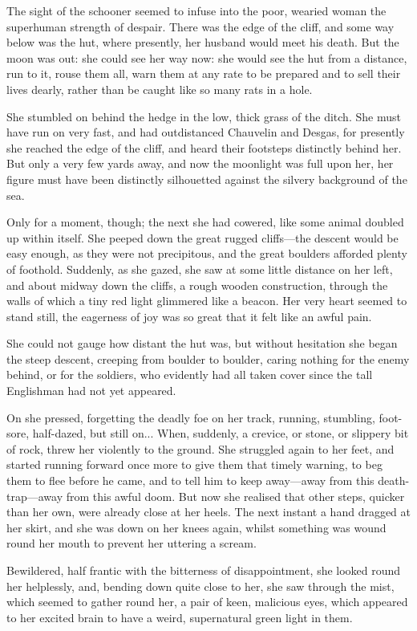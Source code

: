 \documentclass[paper=5.5in:8.5in,BCOR=7mm,twoside,DIV=calc,12pt,usegeometry,chapterprefix,endperiod,headings=big]{scrbook}
\begin{document}
The sight of the schooner seemed to infuse into the poor, wearied woman the superhuman strength of despair. There was the edge of the cliff, and some way below was the hut, where presently, her husband would meet his death. But the moon was out: she could see her way now: she would see the hut from a distance, run to it, rouse them all, warn them at any rate to be prepared and to sell their lives dearly, rather than be caught like so many rats in a hole.

She stumbled on behind the hedge in the low, thick grass of the ditch. She must have run on very fast, and had outdistanced Chauvelin and Desgas, for presently she reached the edge of the cliff, and heard their footsteps distinctly behind her. But only a very few yards away, and now the moonlight was full upon her, her figure must have been distinctly silhouetted against the silvery background of the sea.

Only for a moment, though; the next she had cowered, like some animal doubled up within itself. She peeped down the great rugged cliffs---the descent would be easy enough, as they were not precipitous, and the great boulders afforded plenty of foothold. Suddenly, as she gazed, she saw at some little distance on her left, and about midway down the cliffs, a rough wooden construction, through the walls of which a tiny red light glimmered like a beacon. Her very heart seemed to stand still, the eagerness of joy was so great that it felt like an awful pain.

She could not gauge how distant the hut was, but without hesitation she began the steep descent, creeping from boulder to boulder, caring nothing for the enemy behind, or for the soldiers, who evidently had all taken cover since the tall Englishman had not yet appeared.

On she pressed, forgetting the deadly foe on her track, running, stumbling, foot-sore, half-dazed, but still on... When, suddenly, a crevice, or stone, or slippery bit of rock, threw her violently to the ground. She struggled again to her feet, and started running forward once more to give them that timely warning, to beg them to flee before he came, and to tell him to keep away---away from this death-trap---away from this awful doom. But now she realised that other steps, quicker than her own, were already close at her heels. The next instant a hand dragged at her skirt, and she was down on her knees again, whilst something was wound round her mouth to prevent her uttering a scream.

Bewildered, half frantic with the bitterness of disappointment, she looked round her helplessly, and, bending down quite close to her, she saw through the mist, which seemed to gather round her, a pair of keen, malicious eyes, which appeared to her excited brain to have a weird, supernatural green light in them.
\end{document}
